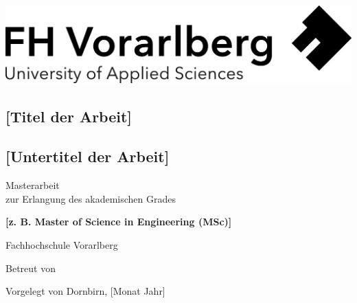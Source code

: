 \thispagestyle{empty}
\begin{titlepage}
  \begin{flushright}
  \includegraphics[width=0.4\linewidth]{resources/images/Logo-A3}
  \end{flushright}
  \begin{flushleft}
  \section*{[Titel der Arbeit]}
  \subsection*{[Untertitel der Arbeit]}
  \vspace{1cm}
  
  Masterarbeit\\
  zur Erlangung des akademischen Grades
  \vspace{0.5cm}
  
  \textbf{[z. B. Master of Science in Engineering (MSc)]}

  \vspace{1cm}
  Fachhochschule Vorarlberg

  \vspace{0.5cm}
  
  Betreut von
  
  \vspace{0.5cm}
  
  Vorgelegt von\newline
  Dornbirn, [Monat Jahr]
  \end{flushleft}
\end{titlepage}